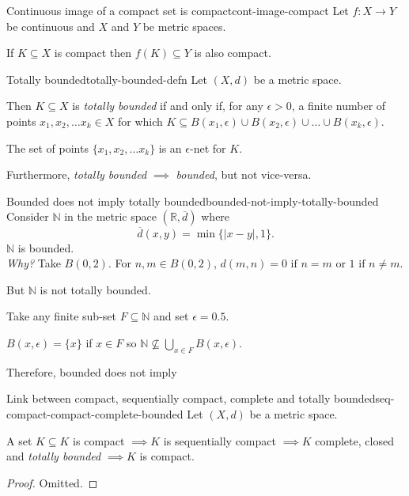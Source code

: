 \documentclass{article}
\numberwithin{equation}{section}
\numberwithin{figure}{section}
\begin{document}
\begin{theorem}{Continuous image of a compact set is compact}{cont-image-compact}
    Let $f:X \to Y$ be continuous and $X$ and $Y$ be metric spaces.

    If $K \subseteq X$ is compact then $f(K)\subseteq Y$ is also compact.
\end{theorem}
\begin{definition}{Totally bounded}{totally-bounded-defn}
    Let $(X,d)$ be a metric space.

    Then $K \subseteq X$ is \emph{totally bounded} if and only if, for any $\epsilon > 0$, a finite number of points $x_1, x_2, \dots x_k \in X$ for which $K \subseteq B(x_1, \epsilon)\cup B(x_2, \epsilon)\cup \dots \cup B(x_k, \epsilon)$.

    The set of points $\{x_1, x_2, \dots x_k\}$ is an $\epsilon$-net for $K$.

    Furthermore, \emph{totally bounded} $\implies$ \emph{bounded}, but not vice-versa.
\end{definition}
\begin{example}{Bounded does not imply totally bounded}{bounded-not-imply-totally-bounded}
    Consider $\mathbb{N}$ in the metric space $(\mathbb{R}, \overline{d})$ where 
    \begin{equation}
        \overline{d}(x,y) = \min{\{|x-y|, 1\}}.
    \end{equation}
        $\mathbb{N}$ is bounded.\\
        \emph{Why?} Take $B(0,2)$. For $n,m \in B(0,2)$, $d(m,n) = 0 \text{ if } n = m \text{ or } 1 \text{ if } n \neq m$. 

        But $\mathbb{N}$ is not totally bounded.

        Take any finite sub-set $F\subseteq \mathbb{N}$ and set $\epsilon=0.5$.

        $B(x, \epsilon) = \{x\}$ if $x \in F$ so $\mathbb{N} \not\subseteq \bigcup\limits_{x \in F} B(x, \epsilon)$.
        
        Therefore, bounded does not imply 
\end{example}
\begin{theorem}{Link between compact, sequentially compact, complete and totally bounded}{seq-compact-compact-complete-bounded}
    Let $(X,d)$ be a metric space.

    A set $K \subseteq K$ is compact $\implies K$ is sequentially compact $\implies K$ complete, closed and \emph{totally bounded} $\implies K$ is compact.

    \begin{proof}
        Omitted.
    \end{proof}
\end{theorem}
\pagebreak
\end{document}
